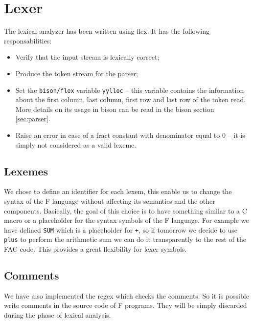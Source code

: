 \section{Lexer}
The lexical analyzer has been written using flex.
It has the following responsabilities:
\begin{itemize}
\item Verify that the input stream is lexically correct;
\item Produce the token stream for the parser;
\item Set the \verb|bison/flex| variable \verb|yylloc| -- this
variable contains the information about the first column, last column,
first row and last row of the token read. More details on its usage in
bison can be read in the bison section \ref{sec:parser}.
\item Raise an error in case of a fract constant with denominator equal
to $0$ -- it is simply not considered as a valid lexeme.
\end{itemize}


\subsection{Lexemes}
We chose to define an identifier for each lexem, this enable us to change the
syntax of the F language without affecting its semantics and the other
components. Basically, the goal of this choice is to have something similar to
a C macro or a placeholder for the syntax symbols of the F language.
For example we have defined \verb|SUM| which is a placeholder for \verb|+|, so
if tomorrow we decide to use \verb|plus| to perform the arithmetic sum we can do
it transparently to the rest of the FAC code. This provides a great flexibility
for lexer symbols.

\subsection{Comments}
We have also implemented the regex which checks the comments. So it is possible
write comments in the source code of F programs. They will be simply discarded
during the phase of lexical analysis.
